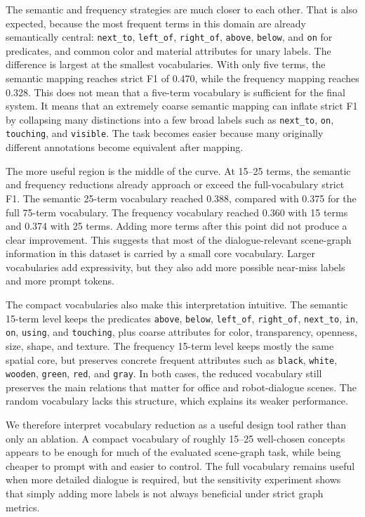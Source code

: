 The semantic and frequency strategies are much closer to each other. That is also expected, because the most frequent terms in this domain are already semantically central: \texttt{next\_to}, \texttt{left\_of}, \texttt{right\_of}, \texttt{above}, \texttt{below}, and \texttt{on} for predicates, and common color and material attributes for unary labels. The difference is largest at the smallest vocabularies. With only five terms, the semantic mapping reaches strict F1 of 0.470, while the frequency mapping reaches 0.328. This does not mean that a five-term vocabulary is sufficient for the final system. It means that an extremely coarse semantic mapping can inflate strict F1 by collapsing many distinctions into a few broad labels such as \texttt{next\_to}, \texttt{on}, \texttt{touching}, and \texttt{visible}. The task becomes easier because many originally different annotations become equivalent after mapping.

The more useful region is the middle of the curve. At 15--25 terms, the semantic and frequency reductions already approach or exceed the full-vocabulary strict F1. The semantic 25-term vocabulary reached 0.388, compared with 0.375 for the full 75-term vocabulary. The frequency vocabulary reached 0.360 with 15 terms and 0.374 with 25 terms. Adding more terms after this point did not produce a clear improvement. This suggests that most of the dialogue-relevant scene-graph information in this dataset is carried by a small core vocabulary. Larger vocabularies add expressivity, but they also add more possible near-miss labels and more prompt tokens.

The compact vocabularies also make this interpretation intuitive. The semantic 15-term level keeps the predicates \texttt{above}, \texttt{below}, \texttt{left\_of}, \texttt{right\_of}, \texttt{next\_to}, \texttt{in}, \texttt{on}, \texttt{using}, and \texttt{touching}, plus coarse attributes for color, transparency, openness, size, shape, and texture. The frequency 15-term level keeps mostly the same spatial core, but preserves concrete frequent attributes such as \texttt{black}, \texttt{white}, \texttt{wooden}, \texttt{green}, \texttt{red}, and \texttt{gray}. In both cases, the reduced vocabulary still preserves the main relations that matter for office and robot-dialogue scenes. The random vocabulary lacks this structure, which explains its weaker performance.

We therefore interpret vocabulary reduction as a useful design tool rather than only an ablation. A compact vocabulary of roughly 15--25 well-chosen concepts appears to be enough for much of the evaluated scene-graph task, while being cheaper to prompt with and easier to control. The full vocabulary remains useful when more detailed dialogue is required, but the sensitivity experiment shows that simply adding more labels is not always beneficial under strict graph metrics.

